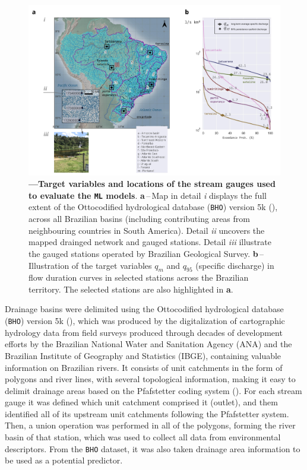 \documentclass[12pt]{article}
\begin{document}
\FloatBarrier
\begin{figure}[htb] %
	\centering                                       
	\includegraphics[width=0.98\linewidth]{figs/target.jpg}    
	\caption[Target variables]
	{\textbf{---\;Target variables and locations of the stream gauges used to evaluate the \texttt{ML} models}.
	\textbf{a}\,--\,Map in detail \textrm{\textit{i}} displays the full extent of the Ottocodified hydrological database (\texttt{BHO}) version 5k (\cite{ana2017}), across all Brazilian basins (including contributing areas from neighbouring countries in South America). Detail \textrm{\textit{ii}} uncovers the mapped drainged network and gauged stations. Detail \textrm{\textit{iii}} illustrate the gauged stations operated by Brazilian Geological Survey.
	\textbf{b}\,--\,Illustration of the target variables $q_{m}$ and $q_{95}$ (specific discharge) in flow duration curves in selected stations across the Brazilian territory. The selected stations are also highlighted in \textbf{a}.
	}
    \label{fig:rivers}            
\end{figure}

\par Drainage basins were delimited using the Ottocodified hydrological database (\texttt{BHO}) version 5k (\cite{ana2017}), which was produced by the digitalization of cartographic hydrology data from field surveys produced through decades of development efforts by the Brazilian National Water and Sanitation Agency (ANA) and the Brazilian Institute of Geography and Statistics (IBGE), containing valuable information on Brazilian rivers. It consists of unit catchments in the form of polygons and river lines, with several topological information, making it easy to delimit drainage areas based on the Pfafstetter coding system (\cite{teixeira2022}). For each stream gauge it was defined which unit catchment comprised it (outlet), and them identified all of its upstream unit catchments following the Pfafstetter system. Then, a union operation was performed in all of the polygons, forming the river basin of that station, which was used to collect all data from environmental descriptors. From the \texttt{BHO} dataset, it was also taken drainage area information to be used as a potential predictor.
\end{document}
